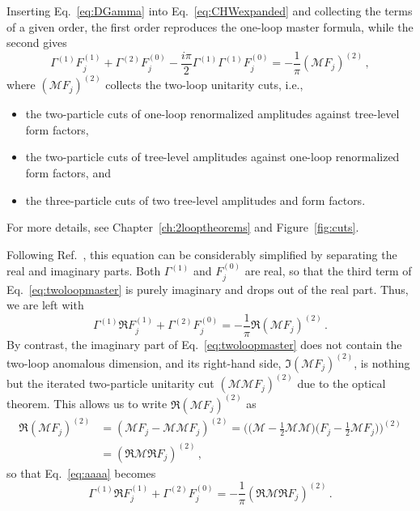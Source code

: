 Inserting Eq.~\eqref{eq:DGamma} into Eq.~\eqref{eq:CHWexpanded} and collecting the terms of a given
order, the first order reproduces the one-loop master formula, while the second gives
\begin{equation}\label{eq:twoloopmaster}
    \Gamma^{(1)}F^{(1)}_j + \Gamma^{(2)}F^{(0)}_j
    - \frac{i\pi}{2}\Gamma^{(1)}\Gamma^{(1)}F^{(0)}_j = -\frac{1}{\pi}(\mathcal M F_j)^{(2)}\,,
\end{equation}
where $(\mathcal M F_j)^{(2)}$ collects the two-loop unitarity cuts, i.e., 
\begin{itemize}
    \item[(a)] the two-particle cuts of one-loop renormalized amplitudes against tree-level form factors,
    \item[(b)] the
two-particle cuts of tree-level amplitudes against one-loop renormalized form factors, and
\item[(c)] the three-particle
cuts of two tree-level amplitudes and form factors.
\end{itemize}
For more details, see Chapter~\ref{ch:2looptheorems} and Figure~\ref{fig:cuts}.

Following Ref.~\cite{Bern:2020ikv}, this equation can be considerably simplified by separating the real and imaginary parts.
Both $\Gamma^{(1)}$ and $F_j^{(0)}$ are real, so that the third term of Eq.~\eqref{eq:twoloopmaster} is purely imaginary and drops out of the real part. Thus, we are left with
\begin{equation}\label{eq:aaaa}
    \Gamma^{(1)}\Re F^{(1)}_j + \Gamma^{(2)}F^{(0)}_j
     = -\frac{1}{\pi}\Re (\mathcal M F_j)^{(2)}\,.
\end{equation}
By contrast, the imaginary part of Eq.~\eqref{eq:twoloopmaster} does not contain the two-loop anomalous dimension, and its right-hand side, $\Im(\mathcal M F_j)^{(2)}$, is nothing but the iterated two-particle unitarity cut $(\mathcal M \mathcal M F_j)^{(2)}$ due to the optical theorem.
This allows us to write $\Re (\mathcal M F_j)^{(2)}$ as
\begin{align}\label{eq:ReMReF}
    \Re (\mathcal M F_j)^{(2)}&=(\mathcal M F_j - \mathcal M\mathcal M F_j)^{(2)}
    = \bigg(\bigg(\mathcal M - \frac{1}{2}\mathcal M\mathcal M\bigg)\bigg(F_j - \frac{1}{2} \mathcal M F_j\bigg)\bigg)^{(2)}\nonumber \\&
    = (\Re \mathcal M  \Re F_j)^{(2)}\,,
\end{align}
so that Eq.~\eqref{eq:aaaa} becomes
\begin{equation}\label{eq:twoloopmaster2}
    \Gamma^{(1)}\Re F^{(1)}_j + \Gamma^{(2)}F^{(0)}_j
     = -\frac{1}{\pi} (\Re\mathcal M \Re F_j)^{(2)}\,.
\end{equation}


